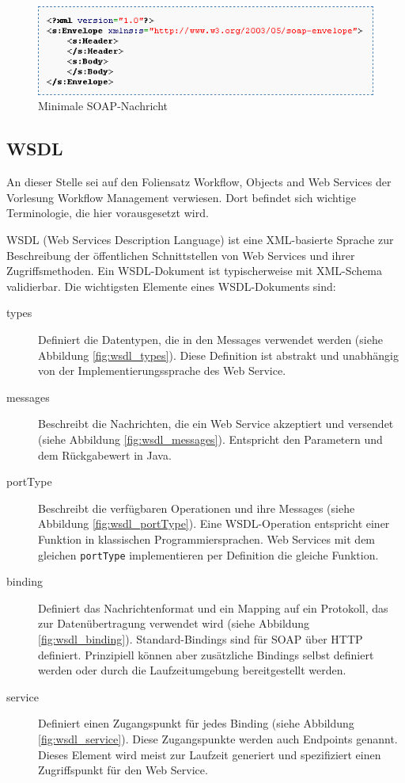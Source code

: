 \documentclass[runningheads]{llncs}
\newcommand{\germanquote}[1]{\glqq{}#1\grqq{}}
\begin{document}
    \begin{figure}[ht!]
      \centering
      \includegraphics[width=\textwidth]{../images/min_soap.png}
      \caption{Minimale SOAP-Nachricht\cite{wkd_soap}}
      \label{fig:min_soap}
    \end{figure}


  \subsection{WSDL}
  \label{wsdl}
  \nocite{wk_wsdl}
  \nocite{tut_wsdl}
    An dieser Stelle sei auf den Foliensatz \germanquote{Workflow, Objects and Web
    Ser\-vi\-ces}\cite{wfm_ch7} der Vorlesung \germanquote{Workflow Management}\cite{wfm_site}
    verwiesen. Dort befindet sich wichtige Terminologie, die hier vorausgesetzt wird.

    WSDL (Web Services Description Language) ist eine XML-basierte Sprache zur Beschreibung der
    öffentlichen Schnittstellen von Web Services und ihrer Zugriffsmethoden. Ein WSDL-Dokument ist
    typischerweise mit XML-Schema validierbar. Die wichtigsten Elemente eines WSDL-Dokuments sind:
    \begin{description}
      \item[types]
        Definiert die Datentypen, die in den Messages verwendet werden (siehe Abbildung
        \ref{fig:wsdl_types}). Diese Definition ist abstrakt und unabhängig von der
        Implementierungssprache des Web Service.
      \item[messages]
        Beschreibt die Nachrichten, die ein Web Service akzeptiert und versendet (siehe Abbildung
        \ref{fig:wsdl_messages}). Entspricht den Parametern und dem Rückgabewert in Java.
      \item[portType]
        Beschreibt die verfügbaren Operationen und ihre Messages (siehe Abbildung
        \ref{fig:wsdl_portType}). Eine WSDL-Operation entspricht einer Funktion in klassischen
        Programmiersprachen. Web Services mit dem gleichen \texttt{portType} implementieren per
        Definition die gleiche Funktion.
      \item[binding]
        Definiert das Nachrichtenformat und ein Mapping auf ein Protokoll, das zur Datenübertragung
        verwendet wird (siehe Abbildung \ref{fig:wsdl_binding}). Standard-Bindings sind für SOAP
        über HTTP definiert. Prinzipiell können aber zusätzliche Bindings selbst definiert werden
        oder durch die Laufzeitumgebung bereitgestellt werden.
      \item[service]
        Definiert einen Zugangspunkt für jedes Binding (siehe Abbildung \ref{fig:wsdl_service}).
        Diese Zugangspunkte werden auch \germanquote{Endpoints} genannt. Dieses Element wird meist
        zur Laufzeit generiert und spezifiziert einen Zugriffspunkt für den Web Service.
     \end{description}
\end{document}
